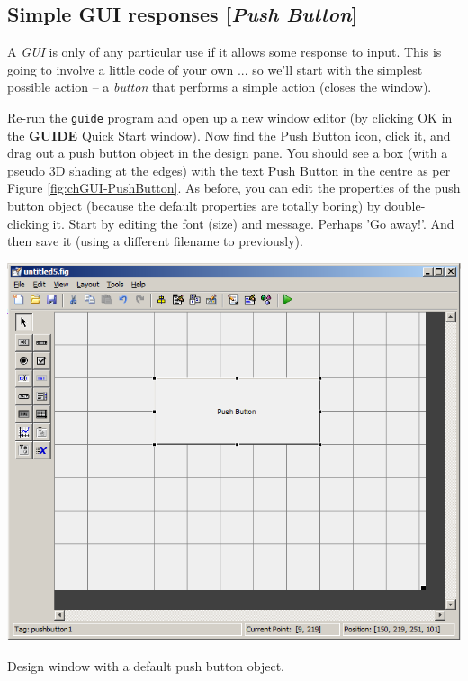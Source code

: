 \documentclass{tufte-book} %
\begin{document}

\subsection{Simple GUI responses [\textit{Push Button}]}

A \textit{GUI} is only of any particular use if it allows some response to input. This is going to involve a little code of your own ... so we'll start with the simplest possible action -- a \textit{button} that performs a simple action (closes the window).

Re-run the \texttt{guide} program and open up a new window editor (by clicking \textsf{OK} in the \textbf{GUIDE} \textsf{Quick Start} window). Now find the \textsf{Push Button} icon, click it, and drag out a push button object in the design pane. You should see a box (with a pseudo 3D shading at the edges) with the text \textsf{Push Button} in the centre as per Figure \ref{fig:chGUI-PushButton}. As before, you can edit the properties of the push button object (because the default properties are totally boring) by double-clicking it. Start by editing the font (size) and message. Perhaps 'Go away!'. And then save it (using a different filename to previously).

\begin{marginfigure}[0.0in]
\includegraphics[width=\linewidth]{chGUI-PushButton.png}
\caption{Design window with a default push button object.}
\label{fig:chGUI-PushButton}
\end{marginfigure}
\end{document}
